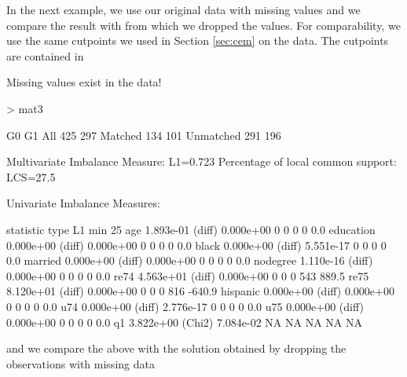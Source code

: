 \documentclass[article]{jss}
\begin{document}
In the next example, we use our original  data with
missing values and we compare the result with  from which we
dropped the  values.  For comparability, we use the same
cutpoints we used in Section \ref{sec:cem} on the  data. The
cutpoints are contained in 

\begin{Schunk}
\begin{Soutput}
Missing values exist in the data!
\end{Soutput}
\begin{Sinput}
> mat3
\end{Sinput}
\begin{Soutput}
           G0  G1
All       425 297
Matched   134 101
Unmatched 291 196


Multivariate Imbalance Measure: L1=0.723
Percentage of local common support: LCS=27.5%

Univariate Imbalance Measures:

          statistic   type        L1 min 25%
age       1.893e-01 (diff) 0.000e+00   0   0   0   0    0.0
education 0.000e+00 (diff) 0.000e+00   0   0   0   0    0.0
black     0.000e+00 (diff) 5.551e-17   0   0   0   0    0.0
married   0.000e+00 (diff) 0.000e+00   0   0   0   0    0.0
nodegree  1.110e-16 (diff) 0.000e+00   0   0   0   0    0.0
re74      4.563e+01 (diff) 0.000e+00   0   0   0 543  889.5
re75      8.120e+01 (diff) 0.000e+00   0   0   0 816 -640.9
hispanic  0.000e+00 (diff) 0.000e+00   0   0   0   0    0.0
u74       0.000e+00 (diff) 2.776e-17   0   0   0   0    0.0
u75       0.000e+00 (diff) 0.000e+00   0   0   0   0    0.0
q1        3.822e+00 (Chi2) 7.084e-02  NA  NA  NA  NA     NA
\end{Soutput}
\end{Schunk}
and we compare the above with the solution obtained by dropping the observations with missing data
\end{document}
